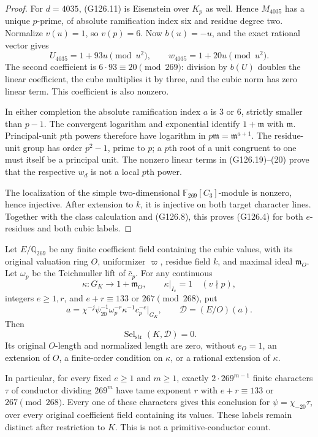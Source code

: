 \begin{proof}
For \(d=4035\), (G126.11) is Eisenstein over \(K_p\)
as well.  Hence \(M_{4035}\) has a unique \(p\)-prime,
of absolute ramification index six and residue degree
two.  Normalize \(v(u)=1\), so \(v(p)=6\).
Now \(b(u)=-u\), and the exact rational vector gives
\[
             U_{4035}=1+93u\pmod {u^2},\qquad
             w_{4035}=1+20u\pmod {u^2}.
 \tag{G126.20}
\]
The second coefficient is \(6\cdot93\equiv20\pmod {269}\):
division by \(b(U)\) doubles the linear coefficient,
the cube multiplies it by three, and the cubic norm
has zero linear term.  This coefficient is also nonzero.

In either completion the absolute ramification index
\(a\) is \(3\) or \(6\), strictly smaller than \(p-1\).
The convergent logarithm and exponential identify
\(1+\mathfrak m\) with \(\mathfrak m\).
Principal-unit \(p\)th powers therefore have logarithm
in \(p\mathfrak m=\mathfrak m^{a+1}\).
The residue-unit group has order \(p^2-1\), prime to
\(p\); a \(p\)th root of a unit congruent to one must
itself be a principal unit.
The nonzero linear terms in (G126.19)--(20) prove that
the respective \(w_d\) is not a local \(p\)th power.

The localization of the simple two-dimensional
\(\mathbb F_{269}[C_3]\)-module is nonzero, hence
injective.  After extension to \(k\), it is injective
on both target character lines.
Together with the class calculation and (G126.8), this
proves (G126.4) for both \(e\)-residues and both cubic
labels.
\end{proof}

\begin{theorem}
\label{AC-G126-lifts}
Let \(E/\mathbb Q_{269}\) be any finite coefficient field
containing the cubic values, with its original valuation
ring \(O\), uniformizer \(\varpi\), residue field \(k\),
and maximal ideal \(\mathfrak m_O\).
Let \(\omega_p\) be the Teichmuller lift of \(\bar c_p\).
For any continuous
\[
 \kappa:G_K\longrightarrow1+\mathfrak m_O,\qquad
 \kappa|_{I_v}=1\quad(v\nmid p),
 \tag{G126.21}
\]
integers \(e\ge1,r\), and \(e+r\equiv133\) or \(267\pmod {268}\),
put
\[
 a=\chi^{-j}\psi_{20}^{-1}\omega_p^{-r}\kappa^{-1}c_p^{-e}|_{G_K},
 \qquad \mathcal D=(E/O)(a).
 \tag{G126.22}
\]
Then
\[
                    \operatorname{Sel}_{\mathrm{str}}(K,\mathcal D)=0.
 \tag{G126.23}
\]
Its original \(O\)-length and normalized length are zero,
without \(e_O=1\), an extension of \(O\), a finite-order
condition on \(\kappa\), or a rational extension of \(\kappa\).

In particular, for every fixed \(e\ge1\) and \(m\ge1\),
exactly \(2\cdot269^{m-1}\) finite characters \(\tau\)
of conductor dividing \(269^m\) have tame exponent \(r\)
with \(e+r\equiv133\) or \(267\pmod{268}\).
Every one of these characters gives this conclusion for
\(\psi=\chi_{-20}\tau\), over every original coefficient
field containing its values.  These labels remain
distinct after restriction to \(K\).  This is not a
primitive-conductor count.
\end{theorem}

